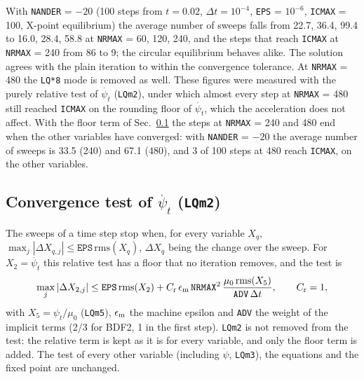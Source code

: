 \documentclass[11pt]{article}
\def\r#1{{\rm#1}}
\def\psid{\dot{\psi}}
\def\psit{\psi_t}
\def\psitd{\dot{\psit}}
\begin{document}
With \texttt{NANDER} = $-20$ (100 steps from $t = 0.02$, $\Delta t = 10^{-4}$,
\texttt{EPS} = $10^{-6}$, \texttt{ICMAX} = 100, X-point equilibrium) the average
number of sweeps falls from 22.7, 36.4, 99.4 to 16.0, 28.4, 58.8 at \texttt{NRMAX} =
60, 120, 240, and the steps that reach \texttt{ICMAX} at \texttt{NRMAX} = 240 from 86 to 9;
the circular equilibrium behaves alike.  The solution agrees with the plain
iteration to within the convergence tolerance.  At \texttt{NRMAX} = 480 the
\texttt{LQ*8} mode is removed as well.  These figures were measured with the
purely relative test of $\psitd$ (\texttt{LQm2}), under which almost every step at
\texttt{NRMAX} = 480 still reached \texttt{ICMAX} on the rounding floor of $\psitd$,
which the acceleration does not affect.  With the floor term of
Sec.~\ref{sec:lqm2tol} the steps at \texttt{NRMAX} = 240 and 480 end when the
other variables have converged: with \texttt{NANDER} = $-20$ the average number
of sweeps is 33.5 (240) and 67.1 (480), and 3 of 100 steps at 480 reach
\texttt{ICMAX}, on the other variables.

\subsection{Convergence test of $\psitd$ (\texttt{LQm2})}
\label{sec:lqm2tol}

The sweeps of a time step stop when, for every variable $X_q$,
$\max_j|\Delta X_{q,j}| \le \texttt{EPS}\,\mathrm{rms}(X_q)$, $\Delta X_q$ being the
change over the sweep.  For $X_2 = \psitd$ this relative test has a floor that no
iteration removes, and the test is
\[
  \max_j|\Delta X_{2,j}| \le \texttt{EPS}\,\mathrm{rms}(X_2)
  + C_\r{r}\,\epsilon_\r{m}\,\texttt{NRMAX}^2\,
    \frac{\mu_0\,\mathrm{rms}(X_5)}{\texttt{ADV}\,\Delta t},
  \qquad C_\r{r} = 1,
\]
with $X_5 = \psit/\mu_0$ (\texttt{LQm5}), $\epsilon_\r{m}$ the machine epsilon and
\texttt{ADV} the weight of the implicit terms (2/3 for BDF2, 1 in the first step).
\texttt{LQm2} is not removed from the test: the relative term is kept as it is
for every variable, and only the floor term is added.  The test of every other
variable (including $\psid$, \texttt{LQm3}), the equations and the fixed point are
unchanged.
\end{document}
